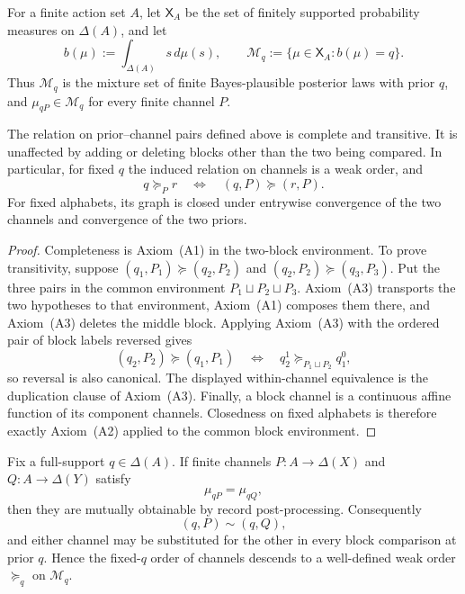 For a finite action set $A$, let $\mathsf X_A$ be the set of finitely
supported probability measures on $\Delta(A)$, and let
\[
 b(\mu):=\int_{\Delta(A)}s\,d\mu(s),
 \qquad
 \mathcal M_q:=\{\mu\in\mathsf X_A:b(\mu)=q\}.
\]
Thus $\mathcal M_q$ is the mixture set of finite Bayes-plausible posterior
laws with prior $q$, and $\mu_{qP}\in\mathcal M_q$ for every finite channel
$P$.

\begin{lemma}\label{pt:lem:blockcoh}
The relation on prior--channel pairs defined above is complete and transitive.
It is unaffected by adding or deleting blocks other than the two being
compared.  In particular, for fixed $q$ the induced relation on channels is a
weak order, and
\[
 q\succeq_P r
 \quad\Longleftrightarrow\quad
 (q,P)\succeq(r,P).
\]
For fixed alphabets, its graph is closed under entrywise convergence of the
two channels and convergence of the two priors.
\end{lemma}

\begin{proof}
Completeness is Axiom~\textup{(A1)} in the two-block environment.  To prove
transitivity, suppose
$(q_1,P_1)\succeq(q_2,P_2)$ and
$(q_2,P_2)\succeq(q_3,P_3)$.  Put the three pairs in the common environment
$P_1\sqcup P_2\sqcup P_3$.  Axiom~\textup{(A3)} transports the two
hypotheses to that environment, Axiom~\textup{(A1)} composes them there, and
Axiom~\textup{(A3)} deletes the middle block.  Applying Axiom~\textup{(A3)}
with the ordered pair of block labels reversed gives
\[
 (q_2,P_2)\succeq(q_1,P_1)
 \quad\Longleftrightarrow\quad
 q_2^1\succeq_{P_1\sqcup P_2}q_1^0,
\]
so reversal is also canonical.  The displayed within-channel equivalence is
the duplication clause of Axiom~\textup{(A3)}.  Finally, a block channel is a
continuous affine function of its component channels.  Closedness on fixed
alphabets is therefore exactly Axiom~\textup{(A2)} applied to the common block
environment.
\end{proof}

\begin{lemma}\label{pt:lem:blackwell}\label{pt:lem:plsuff}
Fix a full-support $q\in\Delta(A)$.  If finite channels
$P:A\to\Delta(X)$ and $Q:A\to\Delta(Y)$ satisfy
\[
 \mu_{qP}=\mu_{qQ},
\]
then they are mutually obtainable by record post-processing.  Consequently
\[
 (q,P)\sim(q,Q),
\]
and either channel may be substituted for the other in every block
comparison at prior $q$.  Hence the fixed-$q$ order of channels descends to a
well-defined weak order $\succeq_q$ on $\mathcal M_q$.
\end{lemma}

